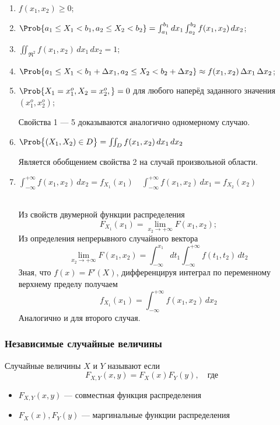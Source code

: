 \begin{enumerate}
	\item $f(x_1, x_2) \geq 0$;
	\item $\Prob\{a_1 \leq X_1 < b_1, a_2 \leq X_2 < b_2\} = \int_{a_1}^{b_1}dx_1\int_{a_2}^{b_2} f(x_1, x_2)\,dx_2$;
	\item $\iint_{\Re^2} f(x_1, x_2)\,dx_1\,dx_2 = 1$;
	\item $\Prob\{a_1 \leq X_1 < b_1 + \Delta x_1, a_2 \leq X_2 < b_2 + \Delta x_2\} \approx f(x_1, x_2)\,\Delta x_1\,\Delta x_2$;
	\item $\Prob\{ X_1 = x_1^o, X_2 = x_2^o, \} = 0$ для любого наперёд заданного значения $(x_1^o, x_2^o)$;
	\begin{Proof}
		Свойства 1 --- 5 доказываются аналогично одномерному случаю.
	\end{Proof}
	\item $\Prob\bigl\{ (X_1, X_2) \in D \bigr\} = \iint_D f(x_1, x_2)\,dx_1\,dx_2$
	\begin{Proof}
		Является обобщением свойства 2 на случай произвольной области.
	\end{Proof}
	\item $\int_{-\infty}^{+\infty} f(x_1, x_2)\,dx_2 = f_{X_1}(x_1) \quad \int_{-\infty}^{+\infty} f(x_1, x_2)\,dx_1 = f_{X_2}(x_2)$
	\begin{Proof}\\
		Из свойств двумерной функции распределения
		\[
			F_{X_1}(x_1) = \lim\limits_{x_2 \to +\infty} F(x_1, x_2);
		\]
		Из определения непрерывного случайного вектора
		\[
			\lim\limits_{x_2 \to +\infty} F(x_1, x_2) = \int_{-\infty}^{x_1} dt_1 \int_{-\infty}^{+\infty} f(t_1, t_2)\,dt_2
		\]
		Зная, что $f(x) = F'(X)$, дифференцируя интеграл по переменному верхнему пределу получаем
		\[
			f_{X_1}(x_1) = \int_{-\infty}^{+\infty} f(x_1, x_2)\,dx_2
		\]
		Аналогично и для второго случая.
	\end{Proof}
\end{enumerate}


\subsubsection{Независимые случайные величины}

\begin{definition}
	Случайные величины $X$ и $Y$ называют  если
	\[
		F_{X, Y}(x, y) = F_{X}(x) F_{Y}(y), \quad \text{где}
	\]
	\begin{itemize}
		\item $F_{X, Y}(x, y)$ --- совместная функция распределения
		\item $F_{X}(x), F_{Y}(y)$ --- маргинальные функции распределения
	\end{itemize}
\end{definition}

